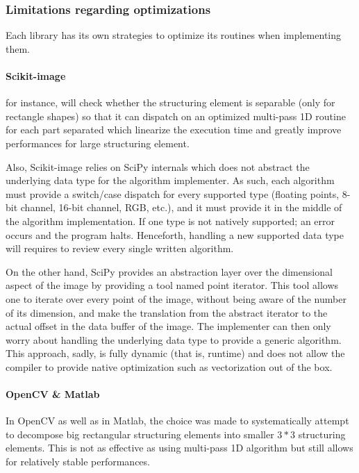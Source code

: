 \subsubsection{Limitations regarding optimizations}

Each library has its own strategies to optimize its routines when implementing them.

\paragraph{Scikit-image} for instance, will check whether the structuring element is separable (only for
rectangle shapes) so that it can dispatch on an optimized multi-pass 1D routine for each part separated which linearize
the execution time and greatly improve performances for large structuring element.

Also, Scikit-image relies on SciPy internals which does not abstract the underlying data type for the algorithm
implementer. As such, each algorithm must provide a switch/case dispatch for every supported type (floating points,
8-bit channel, 16-bit channel, RGB, etc.), and it must provide it in the middle of the algorithm implementation. If one
type is not natively supported; an error occurs and the program halts. Henceforth, handling a new supported data type
will requires to review every single written algorithm.

On the other hand, SciPy provides an abstraction layer over the dimensional aspect of the image by providing a tool
named point iterator. This tool allows one to iterate over every point of the image, without being aware of the number
of its dimension, and make the translation from the abstract iterator to the actual offset in the data buffer of the
image. The implementer can then only worry about handling the underlying data type to provide a generic algorithm. This
approach, sadly, is fully dynamic (that is, runtime) and does not allow the compiler to provide native optimization such
as vectorization out of the box.

\paragraph{OpenCV \& Matlab} In OpenCV as well as in Matlab, the choice was made to systematically attempt to decompose
big rectangular structuring elements into smaller $3*3$ structuring elements. This is not as effective as using
multi-pass 1D algorithm but still allows for relatively stable performances.

